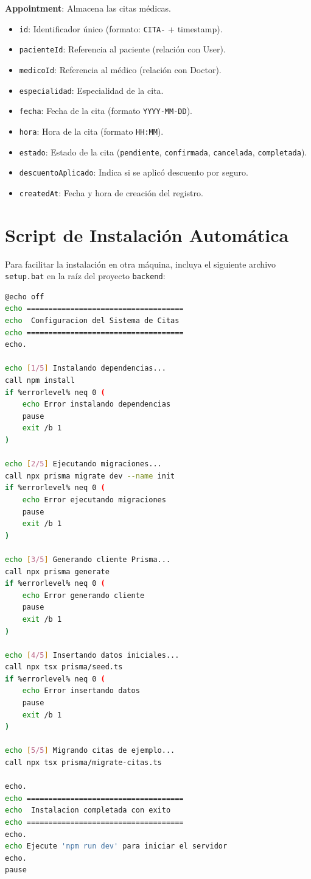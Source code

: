 \documentclass[12pt,a4paper]{article}
\begin{document}
\textbf{Appointment}: Almacena las citas médicas.
\begin{itemize}
    \item \texttt{id}: Identificador único (formato: \texttt{CITA-} + timestamp).
    \item \texttt{pacienteId}: Referencia al paciente (relación con User).
    \item \texttt{medicoId}: Referencia al médico (relación con Doctor).
    \item \texttt{especialidad}: Especialidad de la cita.
    \item \texttt{fecha}: Fecha de la cita (formato \texttt{YYYY-MM-DD}).
    \item \texttt{hora}: Hora de la cita (formato \texttt{HH:MM}).
    \item \texttt{estado}: Estado de la cita (\texttt{pendiente}, \texttt{confirmada}, \texttt{cancelada}, \texttt{completada}).
    \item \texttt{descuentoAplicado}: Indica si se aplicó descuento por seguro.
    \item \texttt{createdAt}: Fecha y hora de creación del registro.
\end{itemize}

\section{Script de Instalación Automática}
Para facilitar la instalación en otra máquina, incluya el siguiente archivo \texttt{setup.bat} en la raíz del proyecto \texttt{backend}:

\begin{lstlisting}[language=bash]
@echo off
echo ====================================
echo  Configuracion del Sistema de Citas
echo ====================================
echo.

echo [1/5] Instalando dependencias...
call npm install
if %errorlevel% neq 0 (
    echo Error instalando dependencias
    pause
    exit /b 1
)

echo [2/5] Ejecutando migraciones...
call npx prisma migrate dev --name init
if %errorlevel% neq 0 (
    echo Error ejecutando migraciones
    pause
    exit /b 1
)

echo [3/5] Generando cliente Prisma...
call npx prisma generate
if %errorlevel% neq 0 (
    echo Error generando cliente
    pause
    exit /b 1
)

echo [4/5] Insertando datos iniciales...
call npx tsx prisma/seed.ts
if %errorlevel% neq 0 (
    echo Error insertando datos
    pause
    exit /b 1
)

echo [5/5] Migrando citas de ejemplo...
call npx tsx prisma/migrate-citas.ts

echo.
echo ====================================
echo  Instalacion completada con exito
echo ====================================
echo.
echo Ejecute 'npm run dev' para iniciar el servidor
echo.
pause
\end{lstlisting}
\end{document}
